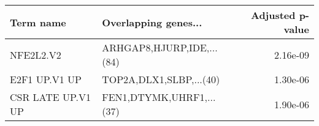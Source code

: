 \begin{tabular}{llr}
\toprule
        Term name &      Overlapping genes... &  Adjusted p-value \\
\midrule
        NFE2L2.V2 & ARHGAP8,HJURP,IDE,...(84) &          2.16e-09 \\
    E2F1 UP.V1 UP &   TOP2A,DLX1,SLBP,...(40) &          1.30e-06 \\
CSR LATE UP.V1 UP &  FEN1,DTYMK,UHRF1,...(37) &          1.90e-06 \\
\bottomrule
\end{tabular}
